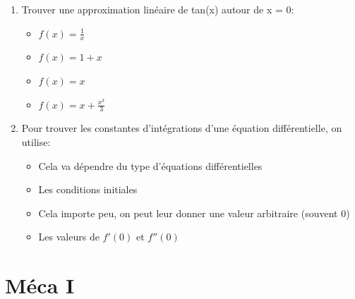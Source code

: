 \documentclass{article}
\begin{document}
\begin{enumerate}

    \item Trouver une approximation linéaire de tan(x) autour de x = 0:
    \begin{itemize}
        \item $f(x) = \frac{1}{x}$
        \item $f(x) = 1 + x$
        \item $f(x) = x$ %
        \item $f(x) = x + \frac{x^3}{3}$
    \end{itemize}
    
    \item Pour trouver les constantes d'intégrations d'une équation différentielle, on utilise:
    \begin{itemize}
        \item Cela va dépendre du type d'équations différentielles
        \item Les conditions initiales
        \item Cela importe peu, on peut leur donner une valeur arbitraire (souvent 0)
        \item Les valeurs de $f'(0)$ et $f''(0)$
    \end{itemize}
    
\end{enumerate}




\section{Méca I}
\end{document}
